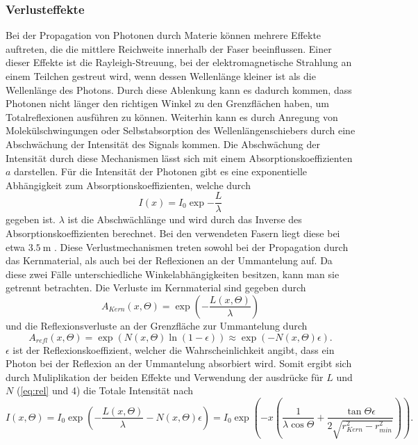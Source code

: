 \subsubsection{Verlusteffekte}

Bei der Propagation von Photonen durch Materie können mehrere Effekte auftreten, die die mittlere Reichweite innerhalb der Faser beeinflussen.
Einer dieser Effekte ist die Rayleigh-Streuung, bei der elektromagnetische Strahlung an einem Teilchen gestreut wird, wenn dessen Wellenlänge
kleiner ist als die Wellenlänge des Photons. Durch diese Ablenkung kann es dadurch kommen, dass Photonen nicht länger den richtigen Winkel zu den
Grenzflächen haben, um Totalreflexionen ausführen zu können. Weiterhin kann es durch Anregung von Molekülschwingungen oder Selbstabsorption
des Wellenlängenschiebers durch eine Abschwächung der Intensität des Signals kommen. Die Abschwächung der Intensität durch diese Mechanismen lässt sich
mit einem Absorptionskoeffizienten $a$ darstellen. Für die Intensität der Photonen gibt es eine exponentielle Abhängigkeit
zum Absorptionskoeffizienten, welche durch
\begin{equation}
    I(x) = I_0 \exp{-\frac{L}{\lambda}}
\end{equation}
gegeben ist. $\lambda$ ist die Abschwächlänge und wird durch das Inverse des Absorptionskoeffizienten berechnet. Bei den verwendeten Fasern
liegt diese bei etwa $\qty{3.5}{\metre}$ \cite{SciFi_Versuch}. Diese Verlustmechanismen treten sowohl bei der Propagation durch das Kernmaterial,
als auch bei der Reflexionen an der Ummantelung auf. Da diese zwei Fälle unterschiedliche Winkelabhängigkeiten besitzen, kann man sie
getrennt betrachten. Die Verluste im Kernmaterial sind gegeben durch
\begin{equation}
    A_{Kern}(x, \Theta) = \exp{\left(- \frac{L(x,\Theta)}{\lambda}\right)}
\end{equation}
und die Reflexionsverluste an der Grenzfläche zur Ummantelung durch
\begin{equation}
    A_{refl}(x, \Theta) = \exp{\left(N(x,\Theta) \ln{(1-\epsilon)}\right)} \approx \exp{\left( -N(x,\Theta) \epsilon \right)}.
\end{equation}
$\epsilon$ ist der Reflexionskoeffizient, welcher die Wahrscheinlichkeit angibt, dass ein Photon bei der Reflexion an der Ummantelung absorbiert wird.
Somit ergibt sich durch Muliplikation der beiden Effekte und Verwendung der ausdrücke für $L$ und $N$ (\autoref{eq:rel} und 4) die Totale Intensität nach
\begin{equation}
    I(x,\Theta) = I_0  \exp{\left( - \frac{L(x,\Theta)}{\lambda}-N(x,\Theta) \epsilon \right)} = I_0  \exp{\left(-x \left( \frac{1}{\lambda\cos{\Theta}}+\frac{ \tan{\Theta}\epsilon}{2 \sqrt{r^2_{Kern} - r^2_{min}}} \right) \right)}.
\end{equation}
